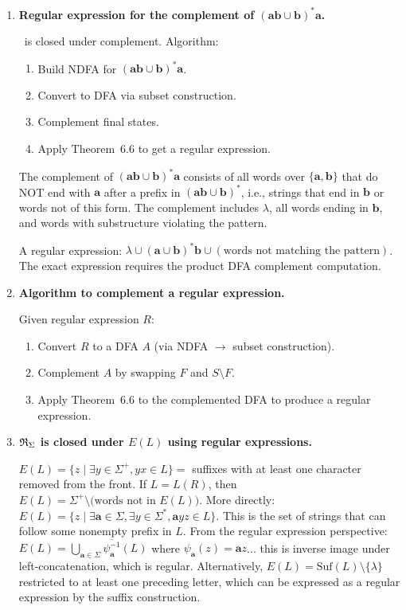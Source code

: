 \begin{enumerate}[{6.}1.]
\item \textbf{Regular expression for the complement of $(\pmb{ab}\cup\pmb{b})^*\pmb{a}$.}

\RSIG\ is closed under complement.  Algorithm:
\begin{enumerate}[1.]
  \item Build NDFA for $(\pmb{ab}\cup\pmb{b})^*\pmb{a}$.
  \item Convert to DFA via subset construction.
  \item Complement final states.
  \item Apply Theorem~6.6 to get a regular expression.
\end{enumerate}
The complement of $(\pmb{ab}\cup\pmb{b})^*\pmb{a}$ consists of all words over $\{\pmb{a},\pmb{b}\}$ that do NOT end with $\pmb{a}$ after a prefix in $(\pmb{ab}\cup\pmb{b})^*$, i.e., strings that end in $\pmb{b}$ or words not of this form.  The complement includes $\lambda$, all words ending in $\pmb{b}$, and words with substructure violating the pattern.

A regular expression: $\lambda\cup(\pmb{a}\cup\pmb{b})^*\pmb{b}\cup(\text{words not matching the pattern})$.  The exact expression requires the product DFA complement computation.

\item \textbf{Algorithm to complement a regular expression.}

Given regular expression $R$:
\begin{enumerate}[1.]
  \item Convert $R$ to a DFA $A$ (via NDFA $\to$ subset construction).
  \item Complement $A$ by swapping $F$ and $S\setminus F$.
  \item Apply Theorem~6.6 to the complemented DFA to produce a regular expression.
\end{enumerate}

\item \textbf{$\mathfrak{R}_\Sigma$ is closed under $E(L)$ using regular expressions.}

$E(L)=\{z\mid\exists y\in\Sigma^+,yx\in L\}=$ suffixes with at least one character removed from the front.  If $L=L(R)$, then $E(L)=\Sigma^+\setminus\text{(words not in }E(L))$.  More directly: $E(L)=\{z\mid\exists\pmb{a}\in\Sigma,\exists y\in\Sigma^*,\pmb{a}yz\in L\}$.  This is the set of strings that can follow some nonempty prefix in $L$.  From the regular expression perspective: $E(L)=\bigcup_{\pmb{a}\in\Sigma}\overline{\psi_{\pmb{a}}^{-1}}(L)$ where $\psi_{\pmb{a}}(z)=\pmb{a}z$... this is inverse image under left-concatenation, which is regular.  Alternatively, $E(L)=\text{Suf}(L)\setminus\{\lambda\}$ restricted to at least one preceding letter, which can be expressed as a regular expression by the suffix construction.


\end{enumerate}
